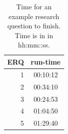 \documentclass{article}
\begin{document}




\begin{table}
  \begin{tabular}{ | r | c | }
    \hline
    \textbf{ERQ} & \textbf{run-time} \\ 
    \hline
      1 & 00:10:12 \\
      2 & 00:34:10 \\
      3 & 00:24:53 \\
      4 & 01:04:50 \\
      5 & 01:29:40 \\
    \hline
  \end{tabular}
  \caption{
    Time for an example research question to finish.
    Time is in in hh:mm::ss.
  }
  \label{tab:runtime}
\end{table}
\end{document}
